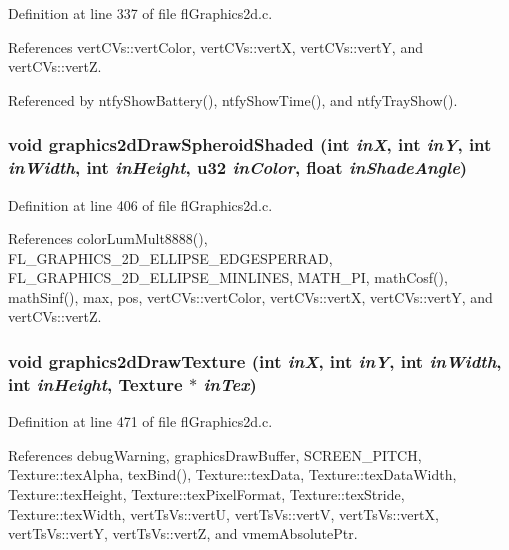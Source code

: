 Definition at line 337 of file fl\-Graphics2d.c.

References vert\-CVs::vert\-Color, vert\-CVs::vert\-X, vert\-CVs::vert\-Y, and vert\-CVs::vert\-Z.

Referenced by ntfy\-Show\-Battery(), ntfy\-Show\-Time(), and ntfy\-Tray\-Show().
\subsubsection{\setlength{\rightskip}{0pt plus 5cm}void graphics2d\-Draw\-Spheroid\-Shaded (int {\em in\-X}, int {\em in\-Y}, int {\em in\-Width}, int {\em in\-Height}, u32 {\em in\-Color}, float {\em in\-Shade\-Angle})}\label{flGraphics2d_8h_f62d364e925524bbd27414944d24c095}




Definition at line 406 of file fl\-Graphics2d.c.

References color\-Lum\-Mult8888(), FL\_\-GRAPHICS\_\-2D\_\-ELLIPSE\_\-EDGESPERRAD, FL\_\-GRAPHICS\_\-2D\_\-ELLIPSE\_\-MINLINES, MATH\_\-PI, math\-Cosf(), math\-Sinf(), max, pos, vert\-CVs::vert\-Color, vert\-CVs::vert\-X, vert\-CVs::vert\-Y, and vert\-CVs::vert\-Z.
\subsubsection{\setlength{\rightskip}{0pt plus 5cm}void graphics2d\-Draw\-Texture (int {\em in\-X}, int {\em in\-Y}, int {\em in\-Width}, int {\em in\-Height}, {\bf Texture} $\ast$ {\em in\-Tex})}\label{flGraphics2d_8h_23111757ed0c0b70bb8131cd0436dd84}




Definition at line 471 of file fl\-Graphics2d.c.

References debug\-Warning, graphics\-Draw\-Buffer, SCREEN\_\-PITCH, Texture::tex\-Alpha, tex\-Bind(), Texture::tex\-Data, Texture::tex\-Data\-Width, Texture::tex\-Height, Texture::tex\-Pixel\-Format, Texture::tex\-Stride, Texture::tex\-Width, vert\-Ts\-Vs::vert\-U, vert\-Ts\-Vs::vert\-V, vert\-Ts\-Vs::vert\-X, vert\-Ts\-Vs::vert\-Y, vert\-Ts\-Vs::vert\-Z, and vmem\-Absolute\-Ptr.
